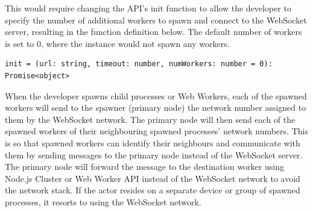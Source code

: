 \documentclass[oneside]{um-fict}
\begin{document}
This would require changing the API's init function to allow the developer to specify the number of additional workers to spawn and connect to the WebSocket server, resulting in the function definition below. The default number of workers is set to 0, where the instance would not spawn any workers.
\begin{lstlisting}
init = (url: string, timeout: number, numWorkers: number = 0): Promise<object>
\end{lstlisting}

When the developer spawns child processes or Web Workers, each of the spawned workers will send to the spawner (primary node) the network number assigned to them by the WebSocket network. The primary node will then send each of the spawned workers of their neighbouring spawned processes' network numbers. This is so that spawned workers can identify their neighbours and communicate with them by sending messages to the primary node instead of the WebSocket server. The primary node will forward the message to the destination worker using Node.js Cluster or Web Worker API instead of the WebSocket network to avoid the network stack. If the actor resides on a separate device or group of spawned processes, it resorts to using the WebSocket network.
\end{document}
